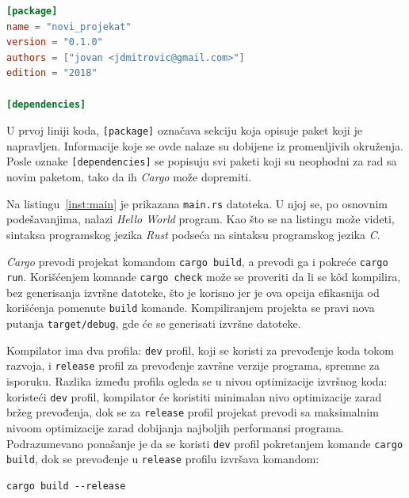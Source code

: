 \documentclass[12pt,oneside]{memoir}
\begin{document}
\begin{lstlisting}[language=TOML,
                   caption={Inicijalna \emph{Cargo.toml} datoteka},
                   label={inst:cargo}]
[package]
name = "novi_projekat"
version = "0.1.0"
authors = ["jovan <jdmitrovic@gmail.com>"]
edition = "2018"

[dependencies]
\end{lstlisting}

U prvoj liniji koda, \texttt{[package]} označava sekciju koja opisuje
paket koji je napravljen. Informacije koje se ovde nalaze su dobijene
iz promenljivih okruženja. Posle oznake \texttt{[dependencies]} se
popisuju svi paketi koji su neophodni za rad sa novim paketom,
tako da ih \emph{Cargo} može dopremiti.

Na listingu~\ref{inst:main} je prikazana \texttt{main.rs} datoteka. U njoj se, po osnovnim
podešavanjima, nalazi \emph{Hello World} program. Kao što se na listingu može videti,
sintaksa programskog jezika \textit{Rust} podseća na sintaksu programskog jezika
\textit{C}.



\emph{Cargo} prevodi projekat komandom
\texttt{cargo build}, a prevodi ga i pokreće
\texttt{cargo run}. Korišćenjem komande \texttt{cargo check}
može se proveriti da li se kôd kompilira, bez generisanja
izvršne datoteke, što je korisno jer je ova opcija efikasnija
od korišćenja pomenute \texttt{build} komande. Kompiliranjem
projekta se pravi nova putanja \texttt{target/debug}, gde će se
generisati izvršne datoteke.

Kompilator ima dva profila: \texttt{dev} profil, koji se koristi za prevođenje koda tokom razvoja, i
\texttt{release} profil za prevođenje završne verzije programa, spremne za isporuku. Razlika između
profila ogleda se u nivou optimizacije izvršnog koda: koristeći \texttt{dev} profil, kompilator
će koristiti minimalan nivo optimizacije zarad bržeg prevođenja, dok se za \texttt{release} profil
projekat prevodi sa maksimalnim nivoom optimizacije zarad dobijanja najboljih performansi
programa. Podrazumevano ponašanje je da se koristi \texttt{dev} profil pokretanjem
komande \texttt{cargo build}, dok se prevođenje u \texttt{release} profilu izvršava komandom:

\begin{lstlisting}[language={}, style=text]
cargo build --release
\end{lstlisting}
\end{document}
